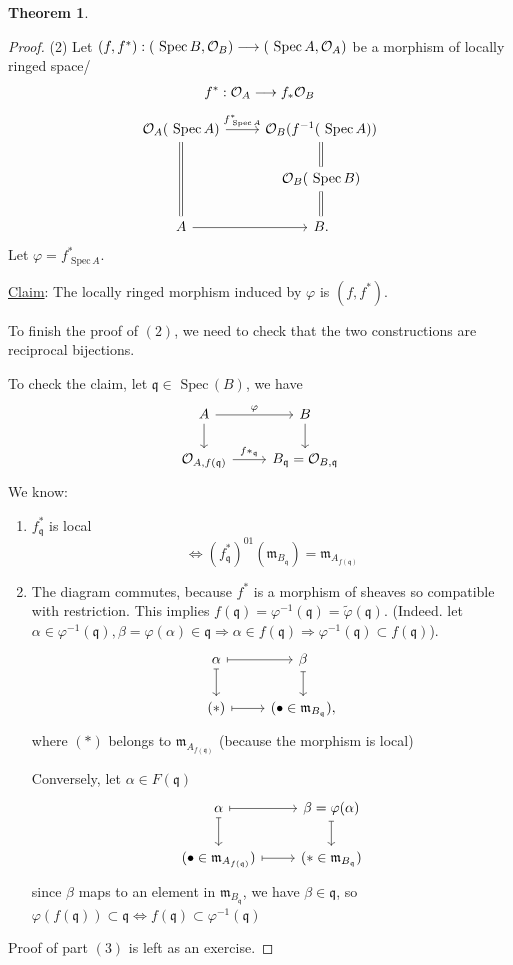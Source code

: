 \documentclass[11pt]{article}
\theoremstyle{definition}
\newtheorem{thm}{Theorem}[section]
\newcommand{\spec}{\text{ Spec}\,}
\newcommand{\scm}{{\mathfrak m}}
\newcommand{\scq}{\mathfrak q}
\newcommand{\calo}{{\cal O}}
\newcommand{\Lrta}{\Longrightarrow}
\newcommand{\lrta}{\longrightarrow}
\newcommand{\Llrta}{\Longleftrightarrow}
\begin{document}
\begin{thm}
\begin{proof}
(2) Let $(f,f^*):(\spec B,\calo_B)\lrta (\spec A,\calo_A)$ be a  morphism of locally ringed space/ 
$$
f^*:\calo_A\lrta f_*\calo_B
$$
$$
\begin{tikzcd}
\calo_A(\spec A) \arrow[dd, equal] \arrow[r, "f^*_{\spec A}"] & \calo_B(f^{-1}(\spec A)) \arrow[d,equal] \\
 & \calo_B(\spec B) \arrow[d,equal] \\
A \arrow[r] & B.
\end{tikzcd}
$$
Let $\varphi=f^*_{\spec A}$.

\underline{Claim}: The locally ringed morphism induced by $\varphi$ is $(f,f^*)$.

To finish the proof of $(2)$, we need to check that the two constructions are reciprocal bijections.

To check the claim, let $\scq\in \spec(B)$, we have
$$
\begin{tikzcd}
A \arrow[r, "\varphi"] \arrow[d] & B \arrow[d] \\
\calo_{A,f(\scq)} \arrow[r, "f*_\scq"] & B_\scq=\calo_{B,\scq}
\end{tikzcd}
$$
We know:
\begin{enumerate}[label=(\arabic*)]
\item $f^*_\scq$ is local 
$$
\Llrta (f^*_\scq)^{01}(\scm_{B_\scq})=\scm_{A_{f(\scq)}}
$$
\item The diagram commutes, because $f^*$ is a morphism of sheaves so compatible with restriction. This implies $f(\scq)=\varphi^{-1}(\scq)=\tilde{\varphi}(\scq)$. (Indeed. let $\alpha\in\varphi^{-1}(\scq),\beta=\varphi(\alpha)\in\scq\Lrta \alpha\in f(\scq)\Lrta \varphi^{-1}(\scq)\subset f(\scq)$).
$$
\begin{tikzcd}
\alpha \arrow[d, maps to] \arrow[r, maps to] & \beta \arrow[d, maps to] \\
(*) \arrow[r, maps to] & (\bullet\in \scm_{B_\scq}),
\end{tikzcd}
$$
where $(*)$ belongs to $\scm_{A_{f(\scq)}}$ (because the morphism is local)

Conversely, let $\alpha\in F(\scq)$
$$
\begin{tikzcd}
\alpha \arrow[d, maps to] \arrow[r, maps to] & \beta=\varphi(\alpha) \arrow[d, maps to] \\
(\bullet\in \scm_{A_{f(\scq)}}) \arrow[r, maps to] & (*\in \scm_{B_\scq})
\end{tikzcd}
$$
since $\beta$ maps to an element in $\scm_{B_\scq}$, we have $\beta\in\scq$, so $\varphi(f(\scq))\subset \scq\Llrta f(\scq)\subset \varphi^{-1}(\scq)$
\end{enumerate}

Proof of part $(3)$ is left as an exercise.
\end{proof}
\end{thm}
\end{document}
